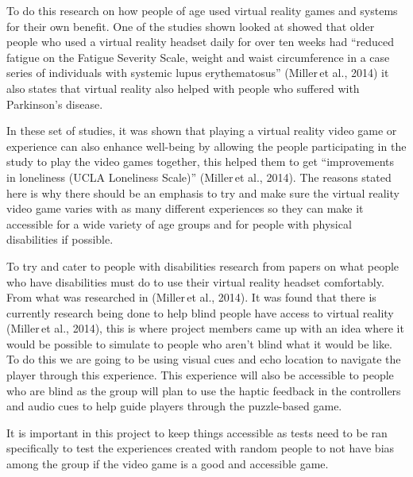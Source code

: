 To do this research on how people of age used virtual reality games and systems for their own benefit. One of the studies shown looked at showed that older people who used a virtual reality headset daily for over ten weeks had “reduced fatigue on the Fatigue Severity Scale, weight and waist circumference in a case series of individuals with systemic lupus erythematosus” (Miller et al., 2014) it also states that virtual reality also helped with people who suffered with Parkinson’s disease. 

 In these set of studies, it was shown that playing a virtual reality video game or experience can also enhance well-being by allowing the people participating in the study to play the video games together, this helped them to get “improvements in loneliness (UCLA Loneliness Scale)” (Miller et al., 2014). The reasons stated here is why there should be an emphasis to try and make sure the virtual reality video game varies with as many different experiences so they can make it accessible for a wide variety of age groups and for people with physical disabilities if possible.  

To try and cater to people with disabilities research from papers on what people who have disabilities must do to use their virtual reality headset comfortably. From what was researched in (Miller et al., 2014). It was found that there is currently research being done to help blind people have access to virtual reality (Miller et al., 2014), this is where project members came up with an idea where it would be possible to simulate to people who aren’t blind what it would be like. To do this we are going to be using visual cues and echo location to navigate the player through this experience. This experience will also be accessible to people who are blind as the group will plan to use the haptic feedback in the controllers and audio cues to help guide players through the puzzle-based game.  

It is important in this project to keep things accessible as tests need to be ran specifically to test the experiences created with random people to not have bias among the group if the video game is a good and accessible game. 

